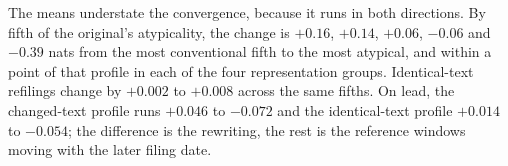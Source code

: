 The means understate the convergence, because it runs in both directions.
By fifth of the original's atypicality, the change is $+0.16$, $+0.14$,
$+0.06$, $-0.06$ and $-0.39$ nats from the most conventional fifth to the
most atypical, and within a point of that profile in each of the four
representation groups. Identical-text refilings change by $+0.002$ to
$+0.008$ across the same fifths. On lead, the changed-text profile runs
$+0.046$ to $-0.072$ and the identical-text profile $+0.014$ to $-0.054$;
the difference is the rewriting, the rest is the reference windows moving
with the later filing date.

